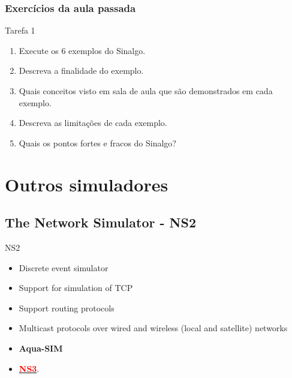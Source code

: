 \documentclass{beamer}
\begin{document}
\begin{frame}\frametitle{Exercícios da aula passada}
	\begin{alertblock}{Tarefa 1}
		\begin{enumerate}
			\item Execute os 6 exemplos do Sinalgo.
			\item Descreva a finalidade do exemplo.
			\item Quais conceitos visto em sala de aula que são demonstrados em cada exemplo.
			\item Descreva as limitações de cada exemplo.
			\item Quais os pontos fortes e fracos do Sinalgo?
		\end{enumerate}
	\end{alertblock}
\end{frame}


\section{Outros simuladores} %
\subsection{The Network Simulator - NS2}

\begin{frame}

\begin{block}{NS2}
	\begin{itemize}
		\item Discrete event simulator
		\item Support for simulation of TCP
		\item Support routing protocols
		\item Multicast protocols over wired and wireless (local and satellite) networks
		\item \textbf{Aqua-SIM}
		\item \href{https://www.nsnam.org/}{\textcolor{red}{\textbf{NS3}}}.
	\end{itemize}
\end{block}

\end{frame}
\end{document}
